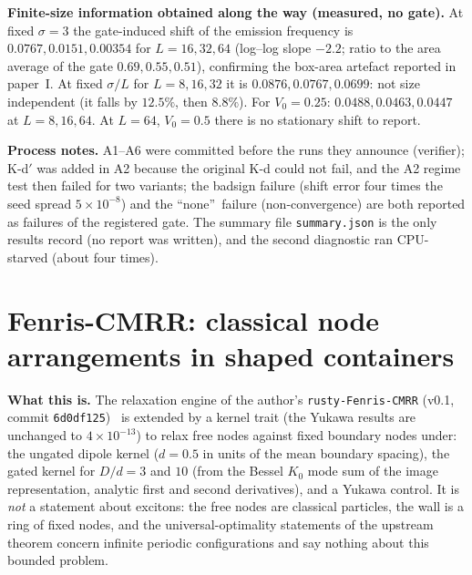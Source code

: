 \documentclass[11pt,a4paper]{article}
\begin{document}
\textbf{Finite-size information obtained along the way (measured, no gate).} At fixed $\sigma=3$ the gate-induced shift of the emission
frequency is $0.0767, 0.0151, 0.00354$ for $L=16,32,64$ (log--log slope $-2.2$; ratio to the area average of the gate $0.69, 0.55, 0.51$),
confirming the box-area artefact reported in paper~I. At fixed $\sigma/L$ for $L=8,16,32$ it is $0.0876, 0.0767, 0.0699$: not size
independent (it falls by $12.5\%$, then $8.8\%$). For $V_0=0.25$: $0.0488, 0.0463, 0.0447$ at $L=8,16,64$. At $L=64$, $V_0=0.5$
there is no stationary shift to report.

\textbf{Process notes.} A1--A6 were committed before the runs they announce (verifier); K-d$'$ was added in A2 because the original K-d could not
fail, and the A2 regime test then failed for two variants; the badsign failure (shift error four times the seed spread $5\times10^{-8}$) and the \textquotedblleft none\textquotedblright\ failure
(non-convergence) are both reported as failures of the registered gate.
The summary file \texttt{summary.json} is the only results record (no report was written), and the second diagnostic ran CPU-starved
(about four times).

\section{Fenris-CMRR: classical node arrangements in shaped containers}\label{sec:fenris}

\textbf{What this is.} The relaxation engine of the author's \texttt{rusty-Fenris-CMRR} (v0.1, commit \texttt{6d0df125})~\cite{Fenris} is
extended by a kernel trait (the Yukawa results are unchanged to $4\times10^{-13}$) to relax free nodes against fixed boundary nodes under:
the ungated dipole kernel ($d=0.5$ in units of the mean boundary spacing), the gated kernel for $D/d=3$ and $10$ (from the Bessel
$K_0$ mode sum of the image representation, analytic first and second derivatives), and a Yukawa control. It is \emph{not} a statement
about excitons: the free nodes are classical particles, the wall is a ring of fixed nodes, and the universal-optimality statements of
the upstream theorem concern infinite periodic configurations and say nothing about this bounded problem.
\end{document}
